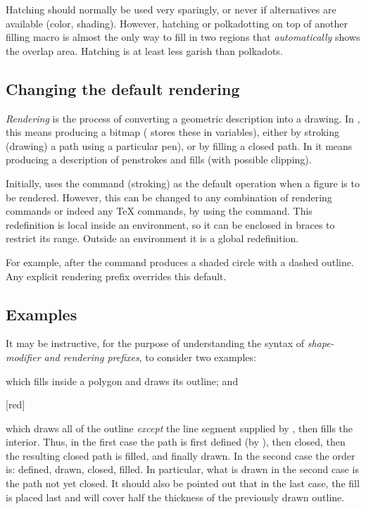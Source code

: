 \documentclass[letterpaper]{article}
\begin{document}
Hatching should normally be used very sparingly, or never if
alternatives are available (color, shading). However, hatching or
polkadotting on top of another filling macro is almost the only way to
fill in two regions that \emph{automatically} shows the overlap area.
Hatching is at least less garish than polkadots.


\subsection{Changing the default rendering}\label{default}

\emph{Rendering} is the process of converting a geometric description
into a drawing.  In \MF{}, this means producing a bitmap (\MF{} stores
these in  variables), either by stroking (drawing) a path
using a particular pen), or by filling a closed path. In \MP{} it means
producing a \PS{} description of penstrokes and fills (with possible
clipping).

\begin{cd}
%
\end{cd}

Initially, \mfp{} uses the  command (stroking) as the default
operation when a figure is to be rendered.  However, this can be changed
to any combination of \mfp{} rendering commands or indeed any \TeX{}
commands, by using the  command.  This redefinition is
local inside an  environment, so it can be enclosed in braces
to restrict its range. Outside an  environment it is a global
redefinition.

For example, after  the
command  produces a shaded circle with a dashed
outline. Any explicit rendering prefix overrides this default.

\subsection{Examples}\label{examples}

It may be instructive, for the purpose of understanding the syntax of
\emph{shape-modifier and rendering prefixes}, to consider two examples:
\begin{ex}
    \marg{$\ldots$}
\end{ex}
which fills inside a polygon and draws its outline; and
\begin{ex}
    [red]\marg{$\ldots$}
\end{ex}
which draws all of the outline \emph{except} the line segment supplied
by , then fills the interior. Thus, in the first case the
path is first defined (by ), then closed, then the resulting closed
path is filled, and finally drawn. In the second case the order is:
defined, drawn, closed, filled. In particular, what is drawn in the
second case is the path not yet closed. It should also be pointed out
that in the last case, the fill is placed last and will cover half
the thickness of the previously drawn outline.
\end{document}
